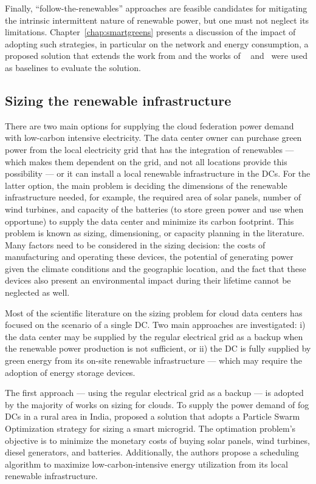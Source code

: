 Finally, ``follow-the-renewables'' approaches are feasible candidates for mitigating the intrinsic intermittent nature of renewable power, but one must not neglect its limitations. Chapter~\ref{chap:smartgreens} presents a discussion of the impact of adopting such strategies, in particular on the network and energy consumption, a proposed solution that extends the work from \citet{NEMESIS} and the works of ~\citet{XU2020191} and~\citet{ALI2021110907} were used as baselines to evaluate the solution.


\subsection{Sizing the renewable infrastructure}


\label{sec:sizing}


There are two main options for supplying the cloud federation power demand with low-carbon intensive electricity. The data center owner can purchase green power from the local electricity grid that has the integration of renewables  --- which makes them dependent on the grid, and not all locations provide this possibility  --- or it can install a local renewable infrastructure in the DCs. For the latter option, the main problem is deciding the dimensions of the renewable infrastructure needed, for example, the required area of solar panels, number of wind turbines, and capacity of the batteries  (to store green power and use when opportune) to supply the data center and minimize its carbon footprint. This problem is known as sizing, dimensioning, or capacity planning in the literature. Many factors need to be considered in the sizing decision: the costs of manufacturing and operating these devices, the potential of generating power given the climate conditions and the geographic location, and the fact that these devices also present an environmental impact during their lifetime cannot be neglected as well.


Most of the scientific literature on the sizing problem for cloud data centers has focused on the scenario of a single DC. Two main approaches are investigated: i) the data center may be supplied by the regular electrical grid as a backup when the renewable power production is not sufficient, or ii) the DC is fully supplied by green energy from its on-site renewable infrastructure --- which may require the adoption of energy storage devices.


The first approach --- using the regular electrical grid as a backup --- is adopted by the majority of works on sizing for clouds. To supply the power demand of fog DCs in a rural area in India, \citet{padma2021_fogdcs_rural} proposed a solution that adopts a Particle Swarm Optimization strategy for sizing a smart microgrid. The optimation problem's objective is to minimize the monetary costs of buying solar panels, wind turbines, diesel generators, and batteries. Additionally, the authors propose a scheduling algorithm to maximize low-carbon-intensive energy utilization from its local renewable infrastructure. %

